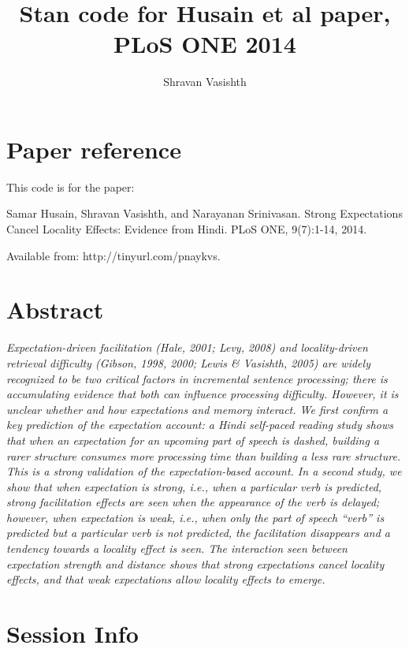 \documentclass{article}
\title{Stan code for Husain et al paper, PLoS ONE 2014}
\author{Shravan Vasishth}
\begin{document}


\maketitle

\section{Paper reference}

This code is for the paper:

Samar Husain, Shravan Vasishth, and Narayanan Srinivasan. Strong Expectations Cancel Locality Effects: Evidence from Hindi. PLoS ONE, 9(7):1-14, 2014.

Available from: http://tinyurl.com/pnaykvs.

\section{Abstract}

\textit{Expectation-driven facilitation (Hale, 2001; Levy, 2008) and locality-driven retrieval difficulty (Gibson, 1998, 2000; Lewis \& Vasishth, 2005) are widely recognized to be two critical factors in incremental sentence processing; there is accumulating evidence that both can influence processing difficulty. However, it is unclear whether and how expectations and memory interact. We first confirm a key prediction of the expectation account: a Hindi self-paced reading study shows that when an expectation for an upcoming part of speech is dashed, building a rarer structure consumes more processing time than building a less rare structure. This is a strong validation of the expectation-based account. In a second study, we show that when expectation is strong, i.e., when a particular verb is predicted, strong facilitation effects are seen when the appearance of the verb is delayed; however, when expectation is weak, i.e., when only the part of speech “verb” is predicted but a particular verb is not predicted, the facilitation disappears and a tendency towards a locality effect is seen. The interaction seen between expectation strength and distance shows that strong expectations cancel locality effects, and that weak expectations allow locality effects to emerge.}

\section{Session Info}
\end{document}
